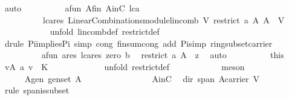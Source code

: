 \begin{isabellebody}
\ auto\isanewline
\ \ \ \ \ \ \ \ \isamarkupfalse%
\ a{\isacharunderscore}fun\ A{\isacharunderscore}fin\ AinC\ lc{\isacharunderscore}a\ \isamarkupfalse%
\ \isanewline
\ \ \ \ \ \ \ \ \ \ lc{\isacharunderscore}a{\isacharunderscore}res{\isacharcolon}\ {\isachardoublequoteopen}LinearCombinations{\isachardot}module{\isachardot}lincomb\ V\ {\isacharparenleft}restrict\ a\ A{\isacharparenright}\ A\ {\isacharequal}\ {\isasymzero}\isactrlbsub V\isactrlesub {\isachardoublequoteclose}\isanewline
\ \ \ \ \ \ \ \ \ \ \isamarkupfalse%
\ {\isacharparenleft}unfold\ lincomb{\isacharunderscore}def\ restrict{\isacharunderscore}def{\isacharparenright}\isanewline
\ \ \ \ \ \ \ \ \ \ \isamarkupfalse%
\ {\isacharparenleft}drule\ Pi{\isacharunderscore}implies{\isacharunderscore}Pi{}{\isacharcomma}\ simp\ cong{\isacharcolon}\ finsum{\isacharunderscore}cong\ add{\isacharcolon}\ Pi{\isacharunderscore}simp\ ring{\isacharunderscore}subset{\isacharunderscore}carrier{\isacharparenright}\isanewline
\ \ \ \ \ \ \ \ \isamarkupfalse%
\ a{\isacharunderscore}fun\ a{\isacharunderscore}res\ lc{\isacharunderscore}a{\isacharunderscore}res\ zero\ b{}\ \isamarkupfalse%
\ {\isachardoublequoteopen}restrict\ a\ A\ {\isacharequal}\ {\isacharquery}z{\isachardoublequoteclose}\ \isamarkupfalse%
\ auto\isanewline
\ \ \ \ \ \ \ \ \isamarkupfalse%
\ this\ \isamarkupfalse%
\ {\isachardoublequoteopen}{\isasymforall}v{\isasymin}A{\isachardot}\ a\ v\ {\isacharequal}\ {\isasymzero}\isactrlbsub K\isactrlesub {\isachardoublequoteclose}\ \isanewline
\ \ \ \ \ \ \ \ \ \ \isamarkupfalse%
\ {\isacharparenleft}unfold\ restrict{\isacharunderscore}def{\isacharparenright}\isanewline
\ \ \ \ \ \ \ \ \ \ \isamarkupfalse%
\ meson\isanewline
\ \ \ \ \ \ \isamarkupfalse%
\isanewline
\ \ \ \ \isamarkupfalse%
\isanewline
\ \ \ \ \isamarkupfalse%
\ A{\isacharunderscore}gen{\isacharcolon}\ {\isachardoublequoteopen}gen{\isacharunderscore}set\ A{\isachardoublequoteclose}\ \isanewline
\ \ \ \ \isamarkupfalse%
\ {\isacharminus}\ \isanewline
\ \ \ \ \ \ \isamarkupfalse%
\ AinC\ \isamarkupfalse%
\ dir{}{\isacharcolon}\ {\isachardoublequoteopen}span\ A{\isasymsubseteq}carrier\ V{\isachardoublequoteclose}\ \isamarkupfalse%
\ {\isacharparenleft}rule\ span{\isacharunderscore}is{\isacharunderscore}subset{}{\isacharparenright}\isanewline

\end{isabellebody}
